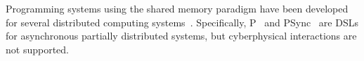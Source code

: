 
%
Programming systems using the  shared memory paradigm have been developed for several distributed computing systems~\cite{dsm1991,Adve96sharedmemory,Azure,Cassandra,Dynamo}.
Specifically, P~\cite{Planguage}  and PSync~\cite{PSyncLanguage} are DSLs for  asynchronous partially  distributed systems, but cyberphysical interactions are not supported.


%

%
%

